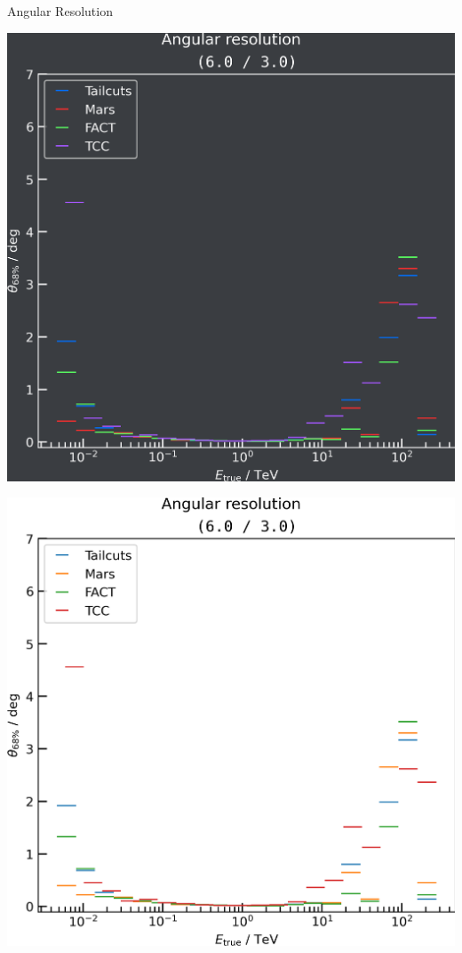 \begin{frame}[label=ang_res]{Angular Resolution}
\begin{minipage}{0.32\textwidth}
    \fi
  \end{minipage}
  \begin{minipage}{0.32\textwidth}
    \ifdefined\darktheme
      \centering
      \hypertarget{ang_res}{\includegraphics[width=\textwidth]{plots/ang_res/ang_res_6.0_3.0_dark.png}}
    \else
      \centering
      \includegraphics[width=\textwidth]{plots/ang_res/ang_res_6.0_3.0_light.png}

\end{minipage}
\end{frame}
